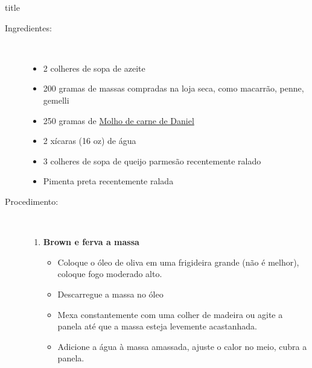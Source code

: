 \documentclass [11pt, letterpaper] {article}
\begin{document}
 {title}
 
\begin {description}

\item [Ingredientes:] \ \\
\begin {itemize}
\item 2 colheres de sopa de azeite
\item 200 gramas de massas compradas na loja seca, como macarrão, penne, gemelli
\item 250 gramas de \href {DanielsMeatSauce.html} {Molho de carne de Daniel}
\item 2 xícaras (16 oz) de água
\item 3 colheres de sopa de queijo parmesão recentemente ralado
\item Pimenta preta recentemente ralada
\end {itemize}

\item [Procedimento:] \ \\
\begin {enumerate}
\item {\bf Brown e ferva a massa}
\begin {itemize}
\item Coloque o óleo de oliva em uma frigideira grande (não é melhor), coloque fogo moderado alto.
        \item Descarregue a massa no óleo
\item Mexa constantemente com uma colher de madeira ou agite a panela até que a massa esteja levemente acastanhada.
\item Adicione a água à massa amassada, ajuste o calor no meio, cubra a panela.


\end{itemize}
\end{enumerate}
\end{description}
\end{document}
